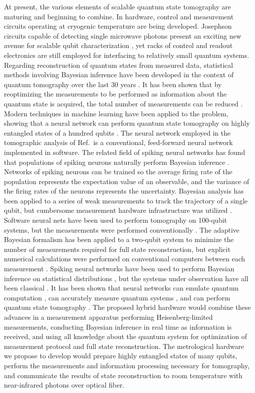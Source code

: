 At present, the various elements of scalable quantum state tomography are maturing and beginning to combine. In hardware, control and measurement circuits operating at cryogenic temperature are being developed. Josephson circuits capable of detecting single microwave photons present an exciting new avenue for scalable qubit characterization \cite{clde2018}, yet racks of control and readout electronics are still employed for interfacing to relatively small quantum systems. Regarding reconstruction of quantum states from measured data, statistical methods involving Bayesian inference have been developed in the context of quantum tomography over the last 30 years \cite{jo1991,jo1994,devu1997,scbr2001,bl2010}. It has been shown that by reoptimizing the measurements to be performed as information about the quantum state is acquired, the total number of measurements can be reduced \cite{huho2012}. Modern techniques in machine learning have been applied to the problem, showing that a neural network can perform quantum state tomography on highly entangled states of a hundred qubits \cite{toma2018}. The neural network employed in the tomographic analysis of Ref.\, is a conventional, feed-forward neural network implemented in software. The related field of spiking neural networks has found that populations of spiking neurons naturally perform Bayesian inference \cite{mabe2006,yash2007,bema2008,add_more_bayesian_neuro_refs_here_and_in_neuro_section}. Networks of spiking neurons can be trained so the average firing rate of the population represents the expectation value of an observable, and the variance of the firing rates of the neurons represents the uncertainty. Bayesian analysis has been applied to a series of weak measurements to track the trajectory of a single qubit, but cumbersome measurement hardware infrastructure was utilized \cite{muwe2013}. Software neural nets have been used to perform tomography on 100-qubit systems, but the measurements were performed conventionally \cite{toma2018}. The adaptive Bayesian formalism has been applied to a two-qubit system to minimize the number of measurements required for full state reconstruction, but explicit numerical calculations were performed on conventional computers between each measurement \cite{stpo2016}. Spiking neural networks have been used to perform Bayesian inference on statistical distributions \cite{bacl2006}, but the systems under observation have all been classical \cite{bema2008}. It has been shown that neural networks can emulate quantum computation \cite{we2018,peme2018,catr2017}, can accurately measure quantum systems \cite{lemo2018}, and can perform quantum state tomography \cite{huho2012}. The proposed hybrid hardware would combine these advances in a measurement apparatus performing Heisenberg-limited measurements, conducting Bayesian inference in real time as information is received, and using all knowledge about the quantum system for optimization of measurement protocol and full state reconstruction. The metrological hardware we propose to develop would prepare highly entangled states of many qubits, perform the measurements and information processing necessary for tomography, and communicate the results of state reconstruction to room temperature with near-infrared photons over optical fiber.

